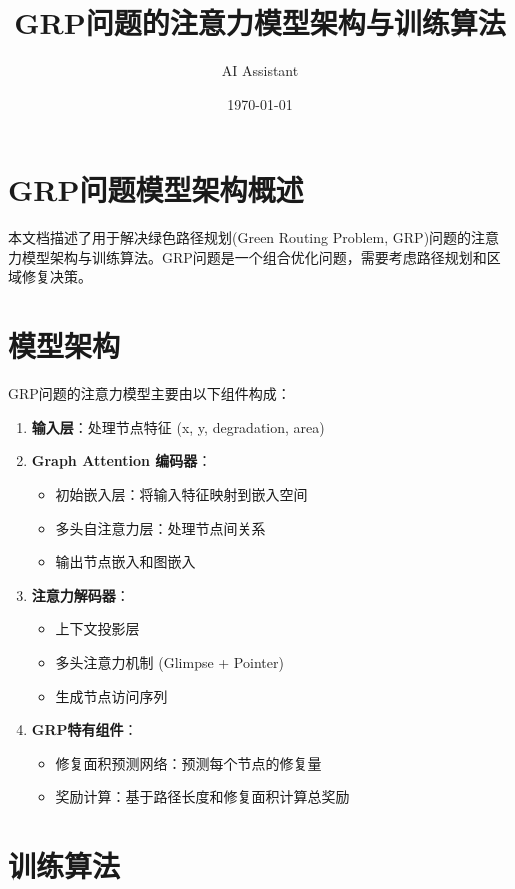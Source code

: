 \documentclass[10pt,a4paper]{article}
\title{GRP问题的注意力模型架构与训练算法}
\author{AI Assistant}
\date{\today}
\begin{document}
\maketitle

\section{GRP问题模型架构概述}

本文档描述了用于解决绿色路径规划(Green Routing Problem, GRP)问题的注意力模型架构与训练算法。GRP问题是一个组合优化问题，需要考虑路径规划和区域修复决策。

\section{模型架构}

GRP问题的注意力模型主要由以下组件构成：

\begin{enumerate}
    \item \textbf{输入层}：处理节点特征 (x, y, degradation, area)
    \item \textbf{Graph Attention 编码器}：
        \begin{itemize}
            \item 初始嵌入层：将输入特征映射到嵌入空间
            \item 多头自注意力层：处理节点间关系
            \item 输出节点嵌入和图嵌入
        \end{itemize}
    \item \textbf{注意力解码器}：
        \begin{itemize}
            \item 上下文投影层
            \item 多头注意力机制 (Glimpse + Pointer)
            \item 生成节点访问序列
        \end{itemize}
    \item \textbf{GRP特有组件}：
        \begin{itemize}
            \item 修复面积预测网络：预测每个节点的修复量
            \item 奖励计算：基于路径长度和修复面积计算总奖励
        \end{itemize}
\end{enumerate}

\section{训练算法}
\end{document}
